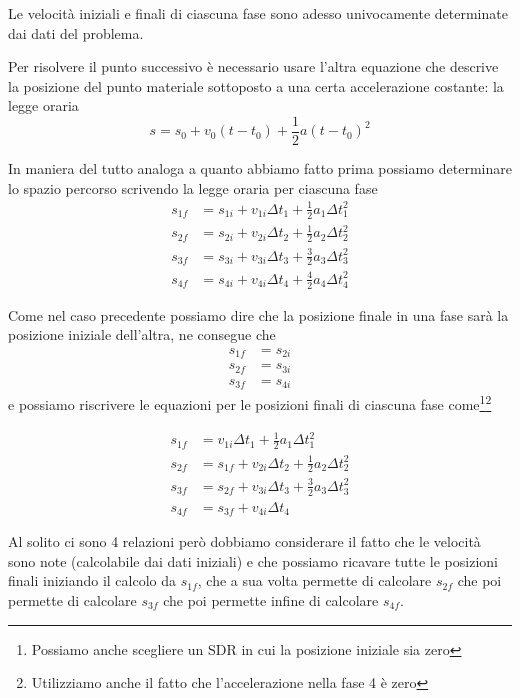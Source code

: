 \documentclass{article}
\begin{document}
Le velocità iniziali e finali di ciascuna fase sono adesso univocamente determinate dai dati del problema.

Per risolvere il punto successivo è necessario usare l'altra equazione che descrive la posizione del punto materiale sottoposto a una certa accelerazione costante: la legge oraria
\begin{equation}
  s = s_0 + v_0 (t-t_0) + \frac{1}{2} a (t-t_0)^2
\end{equation}

In maniera del tutto analoga a quanto abbiamo fatto prima possiamo determinare lo spazio percorso scrivendo la legge oraria per ciascuna fase
\begin{align}
  s_{1f} &= s_{1i} + v_{1i} \Delta t_1 + \frac{1}{2} a_1 \Delta t_1^2\\
  s_{2f} &= s_{2i} + v_{2i} \Delta t_2 + \frac{1}{2} a_2 \Delta t_2^2\\
  s_{3f} &= s_{3i} + v_{3i} \Delta t_3 + \frac{3}{2} a_3 \Delta t_3^2\\
  s_{4f} &= s_{4i} + v_{4i} \Delta t_4 + \frac{4}{2} a_4 \Delta t_4^2
\end{align}

Come nel caso precedente possiamo dire che la posizione finale in una fase sarà la posizione iniziale dell'altra, ne consegue che
\begin{align}
  s_{1f} &= s_{2i} \\
  s_{2f} &= s_{3i} \\
  s_{3f} &= s_{4i}
\end{align}
e possiamo riscrivere le equazioni per le posizioni finali di ciascuna fase come\footnote{Possiamo anche scegliere un SDR in cui la posizione iniziale sia zero}\footnote{Utilizziamo anche il fatto che l'accelerazione nella fase 4 è zero}

\begin{align}
  s_{1f} &= v_{1i} \Delta t_1 + \frac{1}{2} a_1 \Delta t_1^2\\
  s_{2f} &= s_{1f} + v_{2i} \Delta t_2 + \frac{1}{2} a_2 \Delta t_2^2\\
  s_{3f} &= s_{2f} + v_{3i} \Delta t_3 + \frac{3}{2} a_3 \Delta t_3^2\\
  s_{4f} &= s_{3f} + v_{4i} \Delta t_4
\end{align}

Al solito ci sono 4 relazioni però dobbiamo considerare il fatto che le velocità sono note (calcolabile dai dati iniziali) e che possiamo ricavare tutte le posizioni finali iniziando il calcolo da $s_{1f}$, che a sua volta permette di calcolare $s_{2f}$ che poi permette di calcolare $s_{3f}$ che poi permette infine di calcolare $s_{4f}$.
\end{document}
